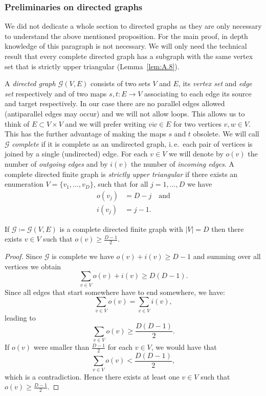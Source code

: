 \subsubsection*{Preliminaries on directed graphs}
We did not dedicate a whole section to directed graphs as they are only necessary to understand the above mentioned proposition. For the main proof, in depth knowledge of this paragraph is not necessary. We will only need the technical result that every complete directed graph has a subgraph with the same vertex set that is strictly upper triangular (Lemma~\ref{lem:A.8}).

\begin{defin}
  A \emph{directed graph \(\mathcal{G}(V,E)\)} consists of two sets \(V\) and \(E\), its \emph{vertex set} and \emph{edge set} respectively and of two maps \(s, t \colon E \to V\) associating to each edge its source and target respectively. In our case there are no parallel edges allowed (antiparallel edges may occur) and we will not allow loops. This allows us to think of \(E \subset V \times V\) and we will prefer writing \(\overline{vw} \in E\) for two vertices \(v,w \in V\). This has the further advantage of making the maps \(s\) and \(t\) obsolete. We will call \(\mathcal{G}\) \emph{complete} if it is complete as an undirected graph, i.\,e.\ each pair of vertices is joined by a single (undirected) edge. For each \(v \in V\) we will denote by \(o(v)\) the number of \emph{outgoing edges} and by \(i(v)\) the number of \emph{incoming edges}. A complete directed finite graph is \emph{strictly upper triangular} if there exists an enumeration \(V = \{v_1, \dots, v_D\}\), such that for all \(j = 1, \dots, D\) we have
  \begin{align*}
    o(v_j) & = D - j\quad \text{and}\\
    i(v_j) & = j - 1.
  \end{align*}
\end{defin}

\begin{lemma}[{\cite[Lemma~A.6]{MR3509968}}]
  \label{lem:A.6}
  If \(\mathcal{G} \coloneqq \mathcal{G}(V,E)\) is a complete directed finite graph with \(|V| = D\) then there exists \(v \in V\) such that \(o(v) \geq \frac{D-1}{2}\).
\end{lemma}

\begin{proof}
  Since \(\mathcal{G}\) is complete we have \(o(v) + i(v) \geq D - 1\) and summing over all vertices we obtain
  \[
    \sum_{v \in V} o(v) + i(v) \geq D(D-1).
  \]
  Since all edges that start somewhere have to end somewhere, we have:
  \[
    \sum_{v \in V} o(v) = \sum_{v \in V} i(v),
  \]
  leading to
  \[
    \sum_{v \in V} o(v) \geq \frac{D(D-1)}{2}.
  \]
  If \(o(v)\) were smaller than \(\frac{D-1}{2}\) for each \(v \in V\), we would have that
  \[
    \sum_{v \in V} o(v) < \frac{D(D-1)}{2},
  \]
  which is a contradiction. Hence there exists at least one \(v \in V\) such that \(o(v) \geq \frac{D-1}{2}\).
\end{proof}

